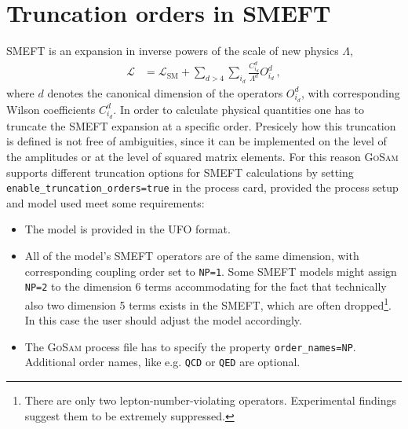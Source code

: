 \documentclass[11pt,a4paper]{refrep}
\newcommand{\gosam}{\textsc{GoSam}\xspace}
\begin{document}
\section{Truncation orders in SMEFT}\label{sec:SMEFTtruncations}
SMEFT is an expansion in inverse powers of the scale of new physics $\Lambda$,
\begin{align}
   \mathcal{L} &= \mathcal{L}_\mathrm{SM} + \sum_{d>4}\sum_{i_d}\frac{C^d_{i_d}}{\Lambda^d}O^d_{i_d}\,,\label{eq:SMEFTLag}
\end{align}
where $d$ denotes the canonical dimension of the operators $O^d_{i_d}$, with corresponding Wilson coefficients $C^d_{i_d}$. In order to calculate physical quantities one has to truncate the SMEFT expansion at a specific order. Presicely how this truncation is defined is not free of ambiguities, since it can be implemented on the level of the amplitudes or at the level of squared matrix elements. For this reason \gosam supports different truncation options for SMEFT calculations by setting \texttt{enable\_truncation\_orders=true} in the process card, provided the process setup and model used meet some requirements:
\begin{itemize}
   \item The model is provided in the UFO format.
   \item All of the model's SMEFT operators are of the same dimension, with corresponding coupling order set to \texttt{NP=1}. Some SMEFT models might assign \texttt{NP=2} to the dimension 6 terms accommodating for the fact that technically also two dimension 5 terms exists in the SMEFT, which are often dropped\footnote{There are only two lepton-number-violating operators. Experimental findings suggest them to be extremely suppressed.}. In this case the user should adjust the model accordingly.
   \item The \gosam process file has to specify the property \texttt{order\_names=NP}. Additional order names, like e.g. \texttt{QCD} or \texttt{QED} are optional.
\end{itemize}
\end{document}

